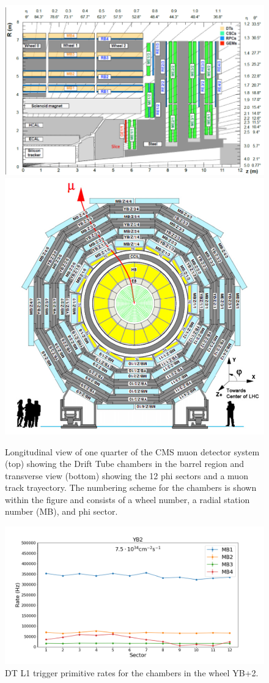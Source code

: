 \begin{figure}[hbtp]
\centering
\includegraphics[width=.8\linewidth]{tex/Part2/fig/DT/DT-longitudinal.png}
\includegraphics[width=.7\linewidth]{tex/Part2/fig/DT/DT-transverse.png}
\caption{
  Longitudinal view of one quarter of the CMS muon detector system (top) showing the Drift Tube chambers in the barrel region
  and transverse view (bottom) showing the 12 phi sectors and a muon track trayectory.
  The numbering scheme for the chambers is shown within the figure and consists of a wheel number, a radial station number (MB), and phi sector.
}
\label{fig:DT_layout}
\end{figure}


\begin{figure}[hbtp]
\centering
\includegraphics[width=.8\linewidth]{tex/Part2/fig/DT/DT-RatesExtrapolated.png}
\caption{DT L1 trigger primitive rates for the chambers in the wheel YB+2.} 
\label{fig:DT_rates}
\end{figure}




